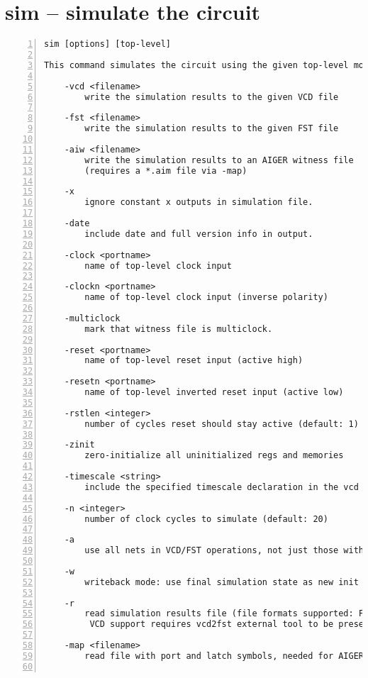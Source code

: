 \section{sim -- simulate the circuit}
\label{cmd:sim}
\begin{lstlisting}[numbers=left,frame=single]
    sim [options] [top-level]

This command simulates the circuit using the given top-level module.

    -vcd <filename>
        write the simulation results to the given VCD file

    -fst <filename>
        write the simulation results to the given FST file

    -aiw <filename>
        write the simulation results to an AIGER witness file
        (requires a *.aim file via -map)

    -x
        ignore constant x outputs in simulation file.

    -date
        include date and full version info in output.

    -clock <portname>
        name of top-level clock input

    -clockn <portname>
        name of top-level clock input (inverse polarity)

    -multiclock
        mark that witness file is multiclock.

    -reset <portname>
        name of top-level reset input (active high)

    -resetn <portname>
        name of top-level inverted reset input (active low)

    -rstlen <integer>
        number of cycles reset should stay active (default: 1)

    -zinit
        zero-initialize all uninitialized regs and memories

    -timescale <string>
        include the specified timescale declaration in the vcd

    -n <integer>
        number of clock cycles to simulate (default: 20)

    -a
        use all nets in VCD/FST operations, not just those with public names

    -w
        writeback mode: use final simulation state as new init state

    -r
        read simulation results file (file formats supported: FST, VCD, AIW and WIT)
		 VCD support requires vcd2fst external tool to be present

    -map <filename>
        read file with port and latch symbols, needed for AIGER witness input


\end{lstlisting}
